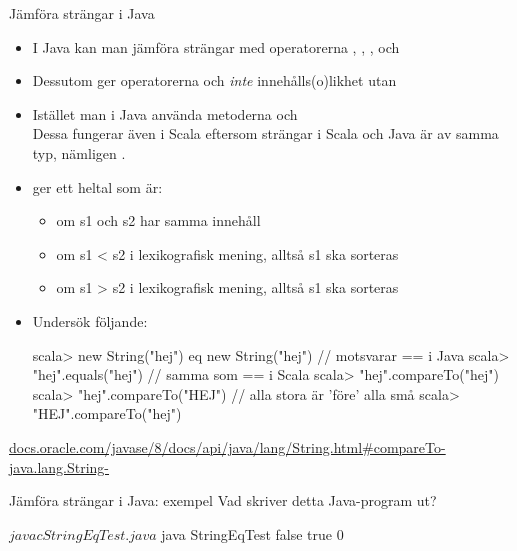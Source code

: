 \begin{Slide}{Jämföra strängar i Java}\SlideFontTiny
\begin{itemize}
\item I Java kan man  jämföra strängar med operatorerna \code{<}, \code{<=}, \code{>}, och \code{>=}

\item Dessutom ger operatorerna \code{==} och \code{!=} \emph{inte} innehålls(o)likhet utan  \code{:(}

\item Istället  man i Java använda metoderna  och 
\\Dessa fungerar även i Scala eftersom strängar i Scala och Java är av samma typ, nämligen .
\pause
\item {} ger ett heltal som är:
\begin{itemize}\SlideFontTiny
\item {} om s1 och s2 har samma innehåll
\item {} om s1 < s2 i lexikografisk mening, alltså s1 ska sorteras 
\item {} om s1 > s2 i lexikografisk mening, alltså s1 ska sorteras 
\end{itemize}

\pause
\item Undersök följande:
\begin{REPL}
scala> new String("hej") eq new String("hej") // motsvarar == i Java
scala> "hej".equals("hej")                    // samma som == i Scala
scala> "hej".compareTo("hej")
scala> "hej".compareTo("HEJ")         // alla stora är 'före' alla små
scala> "HEJ".compareTo("hej")
\end{REPL}
\end{itemize}

\href{http://docs.oracle.com/javase/8/docs/api/java/lang/String.html#compareTo-java.lang.String-}{docs.oracle.com/javase/8/docs/api/java/lang/String.html\#compareTo-java.lang.String-}
\end{Slide}


\begin{Slide}{Jämföra strängar i Java: exempel}\SlideFontSmall
Vad skriver detta Java-program ut?
\pause
\begin{REPL}
$ javac StringEqTest.java
$ java StringEqTest
false
true
0
\end{REPL}
\end{Slide}
